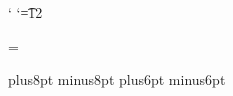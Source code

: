\def\zeropad#1#2{\ifnum1#1>1#2 \zeropad{#1}{0#2}\else#2\fi}

{\catcode` \catcode`\t=12 \gdef\@#1pt{#1}}
\let\@strippt=\@ \let\@=\@undefined

\newdimen\@htddimen
\def\@hextodec#1#2#3#4#5{%
	\@htddimen="#2#3#4#5sp \edef#1{\ea\@strippt\the\@htddimen}}

\newcount{} {}
\def\@defer#1#2{%
	\ea#1\csname$defer\the\defercnt\endcsname{#2}%
	\ea\aftergroup\csname$defer\the\defercnt\endcsname
	\advance\defercnt1 }
\def\defer{\@defer\gdef}
\def\edefer{\@defer\xdef}

\def\savethe#1{\ea\defer\ea{\ea#1\the#1}}

\def\saveif#1{%
	\def\@saveiftrue{\defer{\let#1=\iftrue}}%
	\def\@saveiffalse{\defer{\let#1=\iffalse}}%
	#1\@saveiftrue\else\@saveiffalse\fi}

\def\ascend#1={\def\@ascend{\savethe{#1}}\afterassignment\@ascend#1=}




\parindent=0pt
\parskip=\smallskipamount

\newskip\hugeskipamount \hugeskipamount=24pt plus8pt minus8pt
\newcount\verbpenalty   {}
\newdimen\prob@sidesize \prob@sidesize=20pt
\newdimen\prob@rulegap  \prob@rulegap=5pt
\newskip\prob@topskip   \prob@topskip=16pt plus6pt minus6pt

